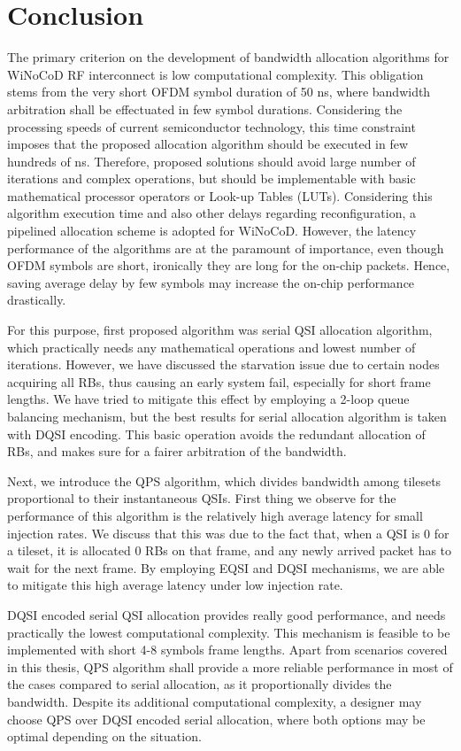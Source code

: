 \section{Conclusion}

The primary criterion on the development of bandwidth allocation algorithms for WiNoCoD RF interconnect is low computational complexity. This obligation stems from the very short OFDM symbol duration of 50 ns, where bandwidth arbitration shall be effectuated in few symbol durations. Considering the processing speeds of current semiconductor technology, this time constraint imposes that the proposed allocation algorithm should be executed in few hundreds of ns. Therefore, proposed solutions should avoid large number of iterations and complex operations, but should be implementable with basic mathematical processor operators or Look-up Tables (LUTs). Considering this algorithm execution time and also other delays regarding reconfiguration, a pipelined allocation scheme is adopted for WiNoCoD. However, the latency performance of the algorithms are at the paramount of importance, even though OFDM symbols are short, ironically they are long for the on-chip packets. Hence, saving average delay by few symbols may increase the on-chip performance drastically.




For this purpose, first proposed algorithm was serial QSI allocation algorithm, which practically needs any mathematical operations and lowest number of iterations. However, we have discussed the starvation issue due to certain nodes acquiring all RBs, thus causing an early system fail, especially for short frame lengths. We have tried to mitigate this effect by employing a 2-loop queue balancing mechanism, but the best results for serial allocation algorithm is taken with DQSI encoding. This basic operation avoids the redundant allocation of RBs, and makes sure for a fairer arbitration of the bandwidth. 

Next, we introduce the QPS algorithm, which divides bandwidth among tilesets proportional to their instantaneous QSIs. First thing we observe for the performance of this algorithm is the relatively high average latency for small injection rates. We discuss that this was due to the fact that, when a QSI is 0 for a tileset, it is allocated 0 RBs on that frame, and any newly arrived packet has to wait for the next frame. By employing EQSI and DQSI mechanisms, we are able to mitigate this high average latency under low injection rate. 


DQSI encoded serial QSI allocation provides really good performance, and needs practically the lowest computational complexity. This mechanism is feasible to be implemented with short 4-8 symbols frame lengths. Apart from scenarios covered in this thesis, QPS algorithm shall provide a more reliable performance in most of the cases compared to serial allocation, as it proportionally divides the bandwidth. Despite its additional computational complexity, a designer may choose QPS over DQSI encoded serial allocation, where both options may be optimal depending on the situation.
